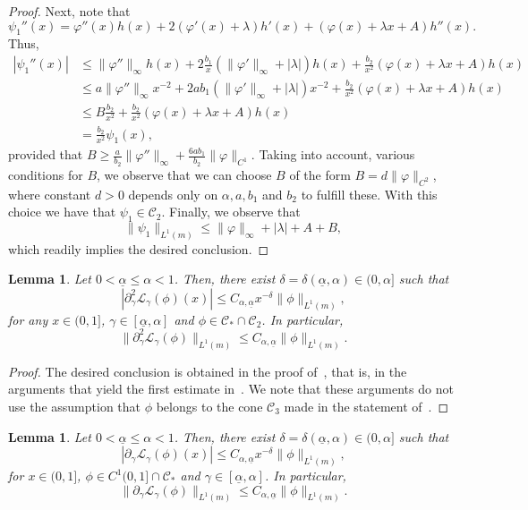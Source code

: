 \documentclass[12pt,reqno,a4paper]{article}
\newtheorem{lemma}[theorem]{Lemma}
\begin{document}
\begin{proof}
	Next, note that 
	\[
	\psi_1''(x)=\varphi''(x)h(x)+2(\varphi'(x)+\lambda)h'(x)+(\varphi(x)+\lambda x+A)h''(x).
	\]
	Thus, 
	\[
	\begin{split}
		|\psi_1''(x)| &\le \|\varphi''\|_\infty h(x)+2\frac{b_1}{x}(\|\varphi'\|_\infty+|\lambda|)h(x)+\frac{b_2}{x^2}(\varphi(x)+\lambda x+A)h(x) \\
		&\le a\|\varphi''\|_\infty x^{-2}+2ab_1(\|\varphi'\|_\infty+|\lambda|)x^{-2}+\frac{b_2}{x^2}(\varphi(x)+\lambda x+A)h(x)\\
		&\le B\frac{b_2}{x^2}+\frac{b_2}{x^2}(\varphi(x)+\lambda x+A)h(x)\\
		&=\frac{b_2}{x^2}\psi_1(x),
	\end{split}
	\]
	provided that $B\ge \frac{a}{b_2}\|\varphi''\|_\infty+\frac{6ab_1}{b_2}\|\varphi\|_{C^1}$. 
	Taking into account, various conditions for $B$,  we observe that we can choose $B$ of the form $B=d\|\varphi\|_{C^2}$, where constant $d>0$ depends only on $\alpha, a, b_1$ and $b_2$ to fulfill these. With this choice we have that 
	$\psi_1\in \mathcal C_2$.
	Finally, we observe that 
	\[
	\|\psi_1\|_{L^1(m)}\le \|\varphi\|_{\infty}+|\lambda|+A+B,
	\]
	which readily implies the desired conclusion.
\end{proof}


\begin{lemma}\label{auxiliarly2}
	Let $0<\underline{\alpha}\le \alpha <1$. Then, there exist $\delta=\delta(\underline{\alpha}, \alpha)\in (0, \alpha]$ such that
	\[
	|\partial_\gamma^2 \mathcal L_\gamma(\phi)(x)| \le C_{\alpha, \underline{\alpha}}x^{-\delta} \|\phi\|_{L^1(m)},
	\]
	for any $x\in (0, 1]$, $\gamma  \in [\underline{\alpha}, \alpha]$ and
	$\phi \in \mathcal C_*\cap \mathcal C_2$. In particular, 
	\[
	\|\partial_\gamma^2 \mathcal L_\gamma(\phi)\|_{L^1(m)}\le C_{\alpha, \underline{\alpha}}\|\phi\|_{L^1(m)}.
	\]
\end{lemma}

\begin{proof}
	The desired conclusion is obtained in the proof of~\cite[Lemma 16]{DGTS}, that is, in the arguments that yield the first estimate in~\cite[(27)]{DGTS}. We note that these arguments do not use the assumption that $\phi$ belongs to the cone $\mathcal C_3$ made in the statement of~\cite[Lemma 16]{DGTS}.
\end{proof}

\begin{lemma}\label{auxiliarly3}
	Let $0<\underline{\alpha}\le \alpha <1$. Then, there exist $\delta=\delta(\underline{\alpha}, \alpha)\in (0, \alpha]$ such that 
	\[
	|\partial_\gamma \mathcal L_\gamma (\phi) (x)|\le C_{\alpha, \underline{\alpha}}x^{-\delta}\|\phi\|_{L^1(m)},
	\]
	for $x\in (0, 1]$, $\phi \in C^1(0, 1]\cap \mathcal C_*$ and $\gamma \in [\underline{\alpha}, \alpha]$. In particular, 
	\[
	\|\partial_\gamma \mathcal L_\gamma (\phi)\|_{L^1(m)}\le C_{\alpha, \underline{\alpha}}\|\phi\|_{L^1(m)}.
	\]
\end{lemma}
\end{document}
